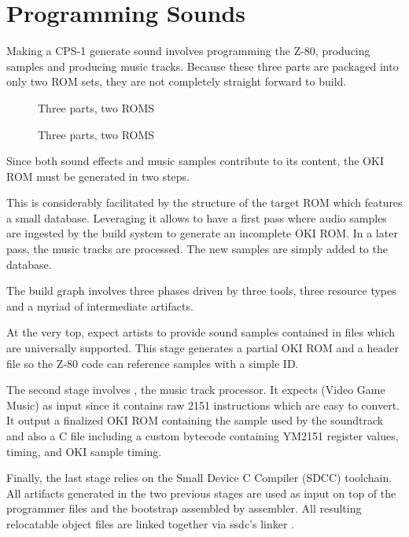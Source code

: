 \chapter{Programming Sounds}

Making a CPS-1 generate sound involves programming the Z-80, producing samples and producing music tracks. Because these three parts are packaged into only two ROM sets, they are not completely straight forward to build. 

 \begin{figure}[H]
\caption*{Three parts, two ROMS}
\end{figure}

 \begin{figure}[H]
\caption*{Three parts, two ROMS}
\end{figure}

Since both sound effects and music samples contribute to its content, the OKI ROM must be generated in two steps.

This is considerably facilitated by the structure of the target ROM which features a small database. Leveraging it allows to have a first pass where audio samples are ingested by the build system to generate an incomplete OKI ROM. In a later pass, the music tracks are processed. The new samples are simply added to the database.


The build graph involves three phases driven by three tools, three resource types and a myriad of intermediate artifacts. 

At the very top,  expect artists to provide sound samples contained in  files which are universally supported. This stage generates a partial OKI ROM and a  header file so the Z-80 code can reference samples with a simple ID.

The second stage involves , the music track processor. It expects  (Video Game Music) as input since it contains raw 2151 instructions which are easy to convert. It output a finalized OKI ROM containing the sample used by the soundtrack and also a  C file including a custom bytecode containing YM2151 register values, timing, and OKI sample timing.

Finally, the last stage relies on the Small Device C Compiler (SDCC) toolchain. All artifacts generated in the two previous stages are used as input on top of the programmer  files and the bootstrap  assembled by  assembler. All resulting relocatable object files  are linked together via ssdc's linker . 


